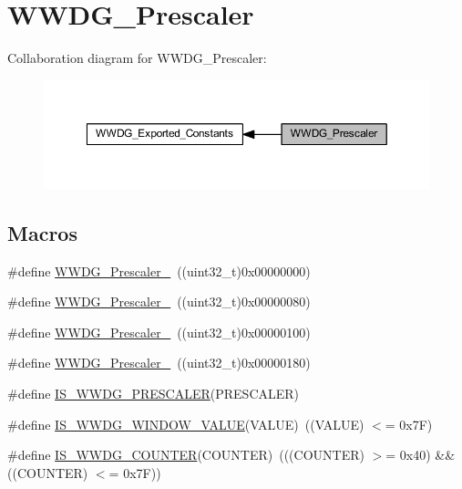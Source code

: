\hypertarget{group___w_w_d_g___prescaler}{}\section{W\+W\+D\+G\+\_\+\+Prescaler}
\label{group___w_w_d_g___prescaler}
Collaboration diagram for W\+W\+D\+G\+\_\+\+Prescaler\+:
\nopagebreak
\begin{figure}[H]
\begin{center}
\leavevmode
\includegraphics[width=350pt]{group___w_w_d_g___prescaler}
\end{center}
\end{figure}
\subsection*{Macros}
\begin{DoxyCompactItemize}
\item 
\#define \hyperlink{group___w_w_d_g___prescaler_ga55780dcf60a252724f5aae2ca37d91c5}{W\+W\+D\+G\+\_\+\+Prescaler\+\_}~((uint32\+\_\+t)0x00000000)
\item 
\#define \hyperlink{group___w_w_d_g___prescaler_ga2ac67d0a7f8691b5ebf0d7d77d6b5f08}{W\+W\+D\+G\+\_\+\+Prescaler\+\_}~((uint32\+\_\+t)0x00000080)
\item 
\#define \hyperlink{group___w_w_d_g___prescaler_gab11714e1816967802a8421587e54a2eb}{W\+W\+D\+G\+\_\+\+Prescaler\+\_}~((uint32\+\_\+t)0x00000100)
\item 
\#define \hyperlink{group___w_w_d_g___prescaler_ga7a4933366603869726bd5ea547d99f02}{W\+W\+D\+G\+\_\+\+Prescaler\+\_}~((uint32\+\_\+t)0x00000180)
\item 
\#define \hyperlink{group___w_w_d_g___prescaler_ga39070de0722a70f99a6fcfe8720b2dfd}{I\+S\+\_\+\+W\+W\+D\+G\+\_\+\+P\+R\+E\+S\+C\+A\+L\+ER}(P\+R\+E\+S\+C\+A\+L\+ER)
\item 
\#define \hyperlink{group___w_w_d_g___prescaler_gab6ea714a2380b7d6547ba97363887868}{I\+S\+\_\+\+W\+W\+D\+G\+\_\+\+W\+I\+N\+D\+O\+W\+\_\+\+V\+A\+L\+UE}(V\+A\+L\+UE)~((V\+A\+L\+UE) $<$= 0x7\+F)
\item 
\#define \hyperlink{group___w_w_d_g___prescaler_ga4728877128cd60494692d8f14389112e}{I\+S\+\_\+\+W\+W\+D\+G\+\_\+\+C\+O\+U\+N\+T\+ER}(C\+O\+U\+N\+T\+ER)~(((C\+O\+U\+N\+T\+ER) $>$= 0x40) \&\& ((\+C\+O\+U\+N\+T\+E\+R) $<$= 0x7\+F))
\end{DoxyCompactItemize}


